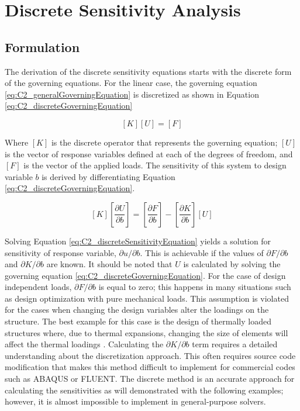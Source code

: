 \section{Discrete Sensitivity Analysis}
\subsection{Formulation}
The derivation of the discrete sensitivity equations starts with the discrete form of the governing equations. For the linear case, the governing equation \eqref{eq:C2_generalGoverningEquation} is discretized as shown in Equation \eqref{eq:C2_discreteGoverningEquation}

\begin{equation}\label{eq:C2_discreteGoverningEquation}
    \left[ K \right] \left[ U \right] = \left[ F \right]
\end{equation}

Where $[K]$ is the discrete operator that represents the governing equation; $[U]$ is the vector of response variables defined at each of the degrees of freedom, and $[F]$ is the vector of the applied loads. The sensitivity of this system to design variable $b$ is derived by differentiating Equation \eqref{eq:C2_discreteGoverningEquation}.

\begin{equation}\label{eq:C2_discreteSensitivityEquation}
    \left[ K \right] \left[ \frac{\partial U}{\partial b} \right] = 
    \left[ \frac{\partial F}{\partial b} \right] - 
    \left[ \frac{\partial K}{\partial b} \right] \left[ U \right]
\end{equation}

Solving Equation \eqref{eq:C2_discreteSensitivityEquation} yields a solution for sensitivity of response variable, $\partial u/\partial b$. This is achievable if the values of $\partial F/\partial b$ and $\partial K/\partial b$ are known. It should be noted that $U$ is calculated by solving the governing equation \eqref{eq:C2_discreteGoverningEquation}. For the case of design independent loads, $\partial F/\partial b$ is equal to zero; this happens in many situations such as design optimization with pure mechanical loads. This assumption is violated for the cases when changing the design variables alter the loadings on the structure. The best example for this case is the design of thermally loaded structures where, due to thermal expansions, changing the size of elements will affect the thermal loadings \cite{deaton2013stiffening}. Calculating the $\partial K/\partial b$ term requires a detailed understanding about the discretization approach. This often requires source code modification that makes this method difficult to implement for commercial codes such as ABAQUS or FLUENT. The discrete method is an accurate approach for calculating the sensitivities as will demonstrated with the following examples; however, it is almost impossible to implement in general-purpose solvers.

